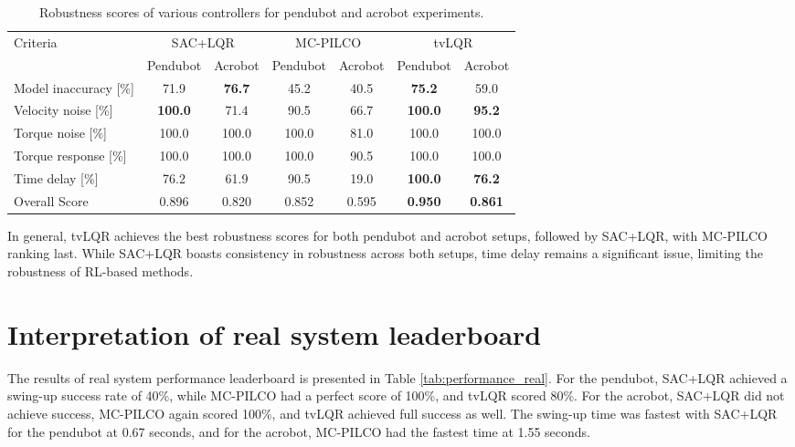 \begin{table}[H]
  \centering
 \begin{tabular}{lcccccc}
 \hline
 Criteria & \multicolumn{2}{c}{SAC+LQR} & \multicolumn{2}{c}{MC-PILCO} & \multicolumn{2}{c}{tvLQR} \\
 & Pendubot & Acrobot & Pendubot & Acrobot & Pendubot & Acrobot \\
 \hline
 Model inaccuracy [\%] & 71.9 & \textbf{76.7} & 45.2 & 40.5 & \textbf{75.2} & 59.0 \\
 Velocity noise [\%] & \textbf{100.0} & 71.4 & 90.5 & 66.7 & \textbf{100.0} & \textbf{95.2} \\
 Torque noise [\%] & 100.0 & 100.0 & 100.0 & 81.0 & 100.0 & 100.0 \\
 Torque response [\%] & 100.0 & 100.0 & 100.0 & 90.5 & 100.0 & 100.0 \\
 Time delay [\%] & 76.2 & 61.9 & 90.5 & 19.0 & \textbf{100.0} & \textbf{76.2} \\
 Overall Score & 0.896 & 0.820 & 0.852 & 0.595 & \textbf{0.950} & \textbf{0.861} \\
 \hline
 \end{tabular}
 \caption{Robustness scores of various controllers for pendubot and acrobot experiments.}
 \label{tab:robustness}
\end{table}

In general, tvLQR achieves the best robustness scores for both pendubot and acrobot setups, followed by SAC+LQR, with MC-PILCO ranking last. While SAC+LQR boasts consistency in robustness across both setups, time delay remains a significant issue, limiting the robustness of RL-based methods.

\section{Interpretation of real system leaderboard}
The results of real system performance leaderboard is presented in Table \ref{tab:performance_real}. For the pendubot, SAC+LQR achieved a swing-up success rate of 40\%, while MC-PILCO had a perfect score of 100\%, and tvLQR scored 80\%. For the acrobot, SAC+LQR did not achieve success, MC-PILCO again scored 100\%, and tvLQR achieved full success as well. The swing-up time was fastest with SAC+LQR for the pendubot at 0.67 seconds, and for the acrobot, MC-PILCO had the fastest time at 1.55 seconds.

